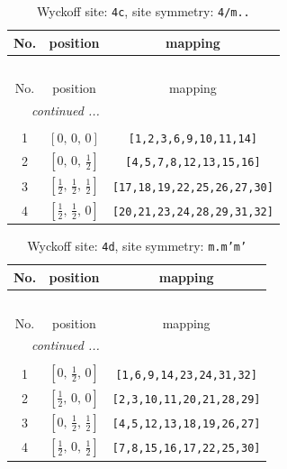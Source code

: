 \documentclass[fleqn,8pt]{jsarticle}
\begin{document}
\renewcommand{\arraystretch}{1.2}
\begin{longtable}{ccc}
\caption{Wyckoff site: {\tt 4c}, site symmetry: {\tt 4/m..}}
 \\
 \hline \hline
No. & position & mapping \\ \hline \endfirsthead

\multicolumn{2}{l}{\tablename\ \thetable{}} \\
 \hline \hline
No. & position & mapping \\ \hline \endhead

 \hline \hline
\multicolumn{2}{r}{\footnotesize\it continued ...} \\ \endfoot

 \hline \hline
\multicolumn{2}{r}{} \\ \endlastfoot

1 & $\left[ 0,\, 0,\, 0 \right]$ & {\tt [1,2,3,6,9,10,11,14]} \\ \hline
2 & $\left[ 0,\, 0,\, \frac{1}{2} \right]$ & {\tt [4,5,7,8,12,13,15,16]} \\ \hline
3 & $\left[ \frac{1}{2},\, \frac{1}{2},\, \frac{1}{2} \right]$ & {\tt [17,18,19,22,25,26,27,30]} \\ \hline
4 & $\left[ \frac{1}{2},\, \frac{1}{2},\, 0 \right]$ & {\tt [20,21,23,24,28,29,31,32]} \\
\end{longtable}
\renewcommand{\arraystretch}{1.2}
\begin{longtable}{ccc}
\caption{Wyckoff site: {\tt 4d}, site symmetry: {\tt m.m'm'}}
 \\
 \hline \hline
No. & position & mapping \\ \hline \endfirsthead

\multicolumn{2}{l}{\tablename\ \thetable{}} \\
 \hline \hline
No. & position & mapping \\ \hline \endhead

 \hline \hline
\multicolumn{2}{r}{\footnotesize\it continued ...} \\ \endfoot

 \hline \hline
\multicolumn{2}{r}{} \\ \endlastfoot

1 & $\left[ 0,\, \frac{1}{2},\, 0 \right]$ & {\tt [1,6,9,14,23,24,31,32]} \\ \hline
2 & $\left[ \frac{1}{2},\, 0,\, 0 \right]$ & {\tt [2,3,10,11,20,21,28,29]} \\ \hline
3 & $\left[ 0,\, \frac{1}{2},\, \frac{1}{2} \right]$ & {\tt [4,5,12,13,18,19,26,27]} \\ \hline
4 & $\left[ \frac{1}{2},\, 0,\, \frac{1}{2} \right]$ & {\tt [7,8,15,16,17,22,25,30]} \\
\end{longtable}
\end{document}

